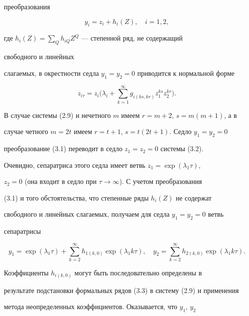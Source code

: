 преобразования 


\begin{equation} 


y_i=z_i+h_i(Z),\quad i=1,2,


\end{equation} 


где $h_i(Z)=\sum\limits_Q h_{iQ}Z^Q$ --- степенной ряд, не содержащий 


свободного и линейных 


слагаемых, в окрестности седла $y_1=y_2=0$ приводится к нормальной форме 


\begin{equation} 


z_{i\tau}=z_i\bigg(\lambda_i+\sum^\infty_{k=1} 


g_{i(ks,kr)} z^{ks}_1z^{kr}_2\bigg). 


\end{equation} 


В случае системы (2.9) и нечетного $m$ имеем $r=m+2$, $s=m(m+1)$, а в 


случае четного $m=2t$ имеем $r=t+1$, $s=t(2t+1)$. Седло $y_1=y_2=0$ 


преобразование (3.1) переводит в седло $z_1=z_2=0$ системы (3.2). 


Очевидно, сепаратриса этого седла имеет ветвь $z_1=\exp(\lambda_1\tau)$, 


$z_2=0$ (она входит в седло при $\tau\to\infty$). С учетом преобразования 


(3.1) и того обстоятельства, что степенные ряды $h_i(Z)$ не содержат 


свободного и линейных слагаемых, получаем для седла $y_1=y_2=0$ ветвь 


сепаратрисы 


\begin{equation} 


y_1=\exp(\lambda_1\tau)+\sum^\infty_{k=2}h_{1(k,0)} 


\exp(\lambda_1k\tau),\quad 


y_2=\sum^\infty_{k=2}h_{2(k,0)}\exp(\lambda_1k\tau). 


\end{equation} 


Коэффициенты $h_{i(k,0)}$ могут быть последовательно определены в 


результате подстановки формальных рядов (3.3) в систему (2.9) и применения 


метода неопределенных коэффициентов. Оказывается, что $y_1$, $y_2$ 


